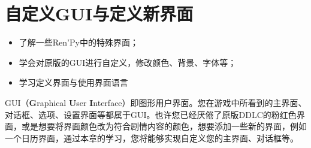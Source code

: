 \chapter{自定义GUI与定义新界面}
\begin{ChapterGoals}
    \begin{itemize}
        \item 了解一些Ren'Py中的特殊界面；
        \item 学会对原版的GUI进行自定义，修改颜色、背景、字体等；
        \item 学习定义界面与使用界面语言
    \end{itemize}
\end{ChapterGoals}
GUI（\textbf{G}raphical \textbf{U}ser \textbf{I}nterface）即图形用户界面。您在游戏中所看到的主界面、对话框、选项、设置界面等都属于GUI。也许您已经厌倦了原版DDLC的粉红色界面，或是想要将界面颜色改为符合剧情内容的颜色，想要添加一些新的界面，例如一个日历界面，通过本章的学习，您将能够实现自定义您的主界面、对话框等。



